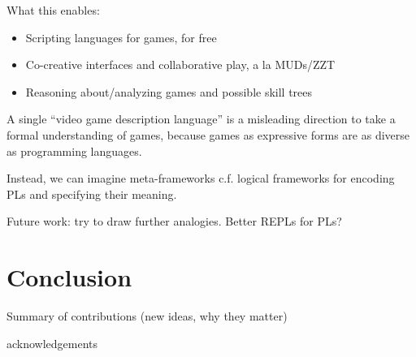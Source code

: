 \documentclass[sigconf]{acmart}
\begin{document}
  What this enables:
  \begin{itemize}
  \item Scripting languages for games, for free
  \item Co-creative interfaces and collaborative play, a la MUDs/ZZT
  \item Reasoning about/analyzing games and possible skill trees
  \end{itemize}

  A single ``video game description language'' is a misleading direction to
  take a formal understanding of games, because games as expressive forms
  are as diverse as programming languages.

  Instead, we can imagine meta-frameworks c.f. logical frameworks for
  encoding PLs and specifying their meaning.

  Future work: try to draw further analogies. Better REPLs for PLs? 

\section{Conclusion}

  Summary of contributions (new ideas, why they matter)

\begin{acks}
  acknowledgements
\end{acks}


 
\end{document}
